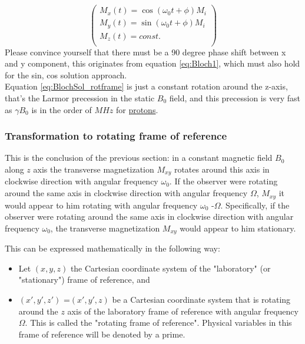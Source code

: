 \documentclass[a4paper,12pt]{extarticle}
\begin{document}
\begin{equation} \label{eq:BlochSol_rotframe}
\begin{pmatrix}
M_x(t)  = \cos (\omega_0 t+\phi) M_i \\
 M_y(t)  = \sin (\omega_0 t+\phi) M_i   \\
 M_z(t)  = const. \\
\end{pmatrix}
\end{equation}Please convince yourself that there must be a 90 degree phase shift between x and y component, this originates from equation \eqref{eq:Bloch1}, which must also hold for the sin, cos solution approach.
\\
Equation \eqref{eq:BlochSol_rotframe} is just a constant rotation around the z-axis, that's the Larmor precession in the static $B_0$ field, and this precession is very fast as $\gamma B_0$ is in the order of $MHz$ for \href{https://en.wikipedia.org/wiki/Gyromagnetic_ratio}{protons}. 
 
\subsubsection{Transformation to rotating frame of reference}
This is the conclusion of the previous section: in a constant magnetic field $B_0$ along $z$ axis the transverse magnetization $M_{xy}$ rotates around this axis in clockwise direction with angular frequency $\omega_0$. If the observer were rotating around the same axis in  clockwise direction with angular frequency  $\Omega$, $M_{xy}$ it would appear to him  rotating with angular frequency  $\omega_0$ -$\Omega$. Specifically, if the observer were rotating around the same axis in
clockwise direction with angular frequency $\omega_0$, the transverse magnetization $M_{xy}$ would appear to him stationary.

This can be expressed mathematically in the following way:
\begin{itemize}
\item Let $(x, y, z)$ the Cartesian coordinate system of the "laboratory" (or "stationary") frame of reference, and
\item $(x', y', z')$ =$(x', y', z)$  be a Cartesian coordinate system that is rotating around the $z$ axis of the laboratory frame of reference with angular frequency $\Omega$. This is called the "rotating frame of reference". Physical variables in this frame of reference will be denoted by a prime.
\end{itemize}
\end{document}
